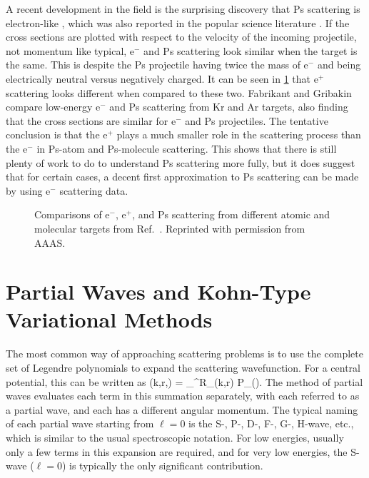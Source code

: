 \documentclass[Dissertation.tex]{subfiles}
\begin{document}
A recent development in the field is the surprising discovery that Ps 
scattering is electron-like \cite{Brawley2010,Brawley2010a}, which was also reported in the
popular science literature \cite{NewScientist2015}. If the cross sections are 
plotted with respect to the velocity of the incoming projectile, not momentum 
like typical, e$^-$ and Ps scattering look similar when the target is the same.
This is despite the Ps projectile having twice the mass of e$^-$ and being 
electrically neutral versus negatively charged. It can be seen in
\cref{fig:ScienceBrawley} that e$^+$ scattering looks different when compared
to these two. Fabrikant and Gribakin
\cite{Fabrikant2014,Fabrikant2014a} compare low-energy e$^-$ and Ps scattering
from Kr and Ar targets, also finding that the cross sections are similar for
e$^-$ and Ps projectiles. The tentative conclusion is that the
e$^+$ plays a much smaller role in the scattering process than the e$^-$
in Ps-atom and Ps-molecule scattering. This shows that there is still
plenty of work to do to understand Ps scattering more fully, but it
does suggest that for certain cases, a decent first approximation to Ps
scattering can be made by using e$^-$ scattering data.

\begin{figure}
	\centering
	\caption[Comparisons of e$^-$, e$^+$, and Ps scattering]{Comparisons of
e$^-$, e$^+$, and Ps scattering from different atomic and molecular targets 
from Ref.~\cite{Brawley2010a}. Reprinted with permission from AAAS.}
	\label{fig:ScienceBrawley}
\end{figure}


\section{Partial Waves and Kohn-Type Variational Methods}
\label{sec:KohnIntro}

The most common way of approaching scattering problems is to use the complete
set of Legendre polynomials to expand the scattering wavefunction. For a
central potential, this can be written as \cite{Bransden2003}
\beq
\label{eq:PartialWave}
\Psi(k,r,\theta) = \sum_{}^\infty R_\ell(k,r) P_\ell(\cos\theta).
\eeq
The method of partial waves evaluates each term in this summation separately,
with each referred to as a partial wave, and each has a different angular 
momentum. The typical naming of each partial wave starting from $\ell = 0$
is the S-, P-, D-, F-, G-, H-wave, etc., which is similar to the usual 
spectroscopic notation. For low energies, usually only a few terms in this
expansion are required, and for very low energies, the S-wave ($\ell = 0$) is 
typically the only significant contribution.
\end{document}
